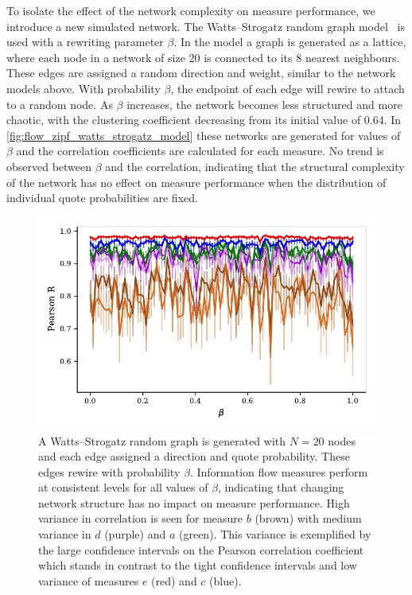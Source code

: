 To isolate the effect of the network complexity on measure performance, we introduce a new simulated network. The Watts–Strogatz random graph model~\cite{watts_collective_1998} is used with a rewriting parameter $\beta$. In the model a graph is generated as a lattice, where each node in a network of size 20 is connected to its 8 nearest neighbours. These edges are assigned a random direction and weight, similar to the network models above. With probability $\beta$, the endpoint of each edge will rewire to attach to a random node. As $\beta$ increases, the network becomes less structured and more chaotic, with the clustering coefficient decreasing from its initial value of 0.64. In \autoref{fig:flow_zipf_watts_strogatz_model} these networks are generated for values of $\beta$ and the correlation coefficients are calculated for each measure. No trend is observed between $\beta$ and the correlation, indicating that the structural complexity of the network has no effect on measure performance when the distribution of individual quote probabilities are fixed. 

\begin{figure}[!htbp]
	\centering
	\includegraphics{chapter3/figs/zipf_watts_strogatz.pdf}
	\caption{A Watts–Strogatz random graph is generated with $N=20$ nodes and each edge assigned a direction and quote probability. These edges rewire with probability $\beta$. Information flow measures perform at consistent levels for all values of $\beta$, indicating that changing network structure has no impact on measure performance. 
	High variance in correlation is seen for measure {\color{brown}$b$ (brown)} with medium variance in {\color{violet}$d$ (purple)} and {\color{green!80!black}$a$ (green)}. This variance is exemplified by the large confidence intervals on the Pearson correlation coefficient which stands in contrast to the tight confidence intervals and low variance of measures {\color{red}$e$ (red)} and {\color{blue!80!black}$c$ (blue)}.}
	\label{fig:flow_zipf_watts_strogatz_model}
\end{figure}

